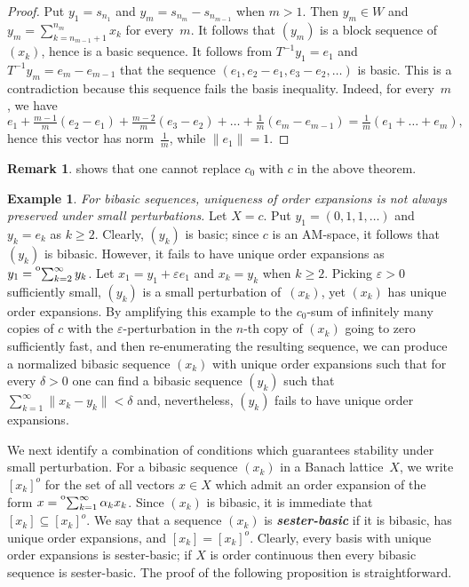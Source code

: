 \documentclass[12pt]{amsart}
\theoremstyle{plain}
\theoremstyle{definition}
\newtheorem{remark}[theorem]{Remark}
\newtheorem{example}[theorem]{Example}
\newcommand{\norm}[1]{\lVert#1\rVert}
\newcommand{\term}[1]{{\textit{\textbf{#1}}}}   %
\newcommand{\tos}{\prescript{{\rm o}}{}{\sum_{k=1}^\infty\,}}
\renewcommand{\ge}{\geqslant}
\begin{document}
\begin{proof}
  Put $y_1=s_{n_1}$ and $y_m=s_{n_m}-s_{n_{m-1}}$ when $m>1$. Then
  $y_m\in W$ and $y_m=\sum_{k=n_{m-1}+1}^{n_m}x_k$ for every~$m$. It
  follows that $(y_m)$ is a block sequence of~$(x_k)$, hence is a
  basic sequence. It follows from $T^{-1}y_1=e_1$ and
  $T^{-1}y_m=e_m-e_{m-1}$ that the sequence
  $(e_1,e_2-e_1,e_3-e_2,\dots)$ is basic. This is a contradiction
  because this sequence fails the basis inequality. Indeed, for
  every~$m$, we have
  \begin{displaymath}
    e_1+\tfrac{m-1}{m}(e_2-e_1)+\tfrac{m-2}{m}(e_3-e_2)+
    \dots+\tfrac{1}{m}(e_m-e_{m-1})=\tfrac1m(e_1+\dots+e_m),
  \end{displaymath}
  hence this vector has norm~$\frac1m$, while $\norm{e_1}=1$.
\end{proof}

\begin{remark}
   shows that one cannot replace $c_0$ with $c$
  in the above theorem.
\end{remark}

\begin{example}\label{not sester}
  \emph{For bibasic sequences, uniqueness of order expansions is not
    always preserved under small perturbations.}  Let $X=c$. Put
  $y_1=(0,1,1,\dots)$ and $y_k=e_k$ as $k\ge 2$. Clearly, $(y_k)$ is
  basic; since $c$ is an AM-space, it follows that $(y_k)$ is
  bibasic. However, it fails to have unique order expansions as
  $y_1=\prescript{{\rm o}}{}{\sum_{k=2}^\infty\,}y_k$. Let
  $x_1=y_1+\varepsilon e_1$ and $x_k=y_k$ when $k\ge 2$. Picking
  $\varepsilon>0$ sufficiently small, $(y_k)$ is a small perturbation
  of~$(x_k)$, yet $(x_k)$ has unique order expansions.  By amplifying
  this example to the $c_0$-sum of infinitely many copies of $c$ with
  the $\varepsilon$-perturbation in the $n$-th copy of $(x_k)$ going
  to zero sufficiently fast, and then re-enumerating the resulting
  sequence, we can produce a normalized bibasic sequence $(x_k)$ with
  unique order expansions such that for every $\delta>0$ one can find
  a bibasic sequence $(y_k)$ such that
  $\sum_{k=1}^\infty\norm{x_k-y_k}<\delta$ and, nevertheless, $(y_k)$
  fails to have unique order expansions.
\end{example}

We next identify a combination of conditions which guarantees
stability under small perturbation. For a bibasic sequence $(x_k)$ in
a Banach lattice~$X$, we write $[x_k]^o$ for the set of all vectors
$x\in X$ which admit an order expansion of the form
$x=\tos\alpha_kx_k$. Since $(x_k)$ is bibasic, it is immediate that
$[x_k]\subseteq [x_k]^o$. We say that a sequence $(x_k)$ is
\term{sester-basic} if it is bibasic, has unique order expansions, and
$[x_k]=[x_k]^o$. Clearly, every basis with unique order expansions is
sester-basic; if $X$ is order continuous then every bibasic sequence
is sester-basic.  The proof of the following proposition is
straightforward.
\end{document}
